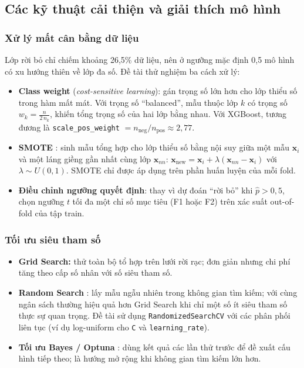 \subsection{Các kỹ thuật cải thiện và giải thích mô hình}

\subsubsection{Xử lý mất cân bằng dữ liệu}
Lớp rời bỏ chỉ chiếm khoảng 26,5\% dữ liệu, nên ở ngưỡng mặc định 0,5 mô hình có xu hướng thiên về lớp đa số. Đề tài thử nghiệm ba cách xử lý:
\begin{itemize}
    \item \textbf{Class weight} (\textit{cost-sensitive learning}): gán trọng số lớn hơn cho lớp thiểu số trong hàm mất mát. Với trọng số ``balanced'', mẫu thuộc lớp $k$ có trọng số $w_k = \frac{n}{2\, n_k}$, khiến tổng trọng số của hai lớp bằng nhau. Với XGBoost, tương đương là \texttt{scale\_pos\_weight} $= n_{\text{neg}} / n_{\text{pos}} \approx 2{,}77$.
    \item \textbf{SMOTE} \cite{chawla2002}: sinh mẫu tổng hợp cho lớp thiểu số bằng nội suy giữa một mẫu $\mathbf{x}_i$ và một láng giềng gần nhất cùng lớp $\mathbf{x}_{nn}$: $\mathbf{x}_{\text{new}} = \mathbf{x}_i + \lambda(\mathbf{x}_{nn} - \mathbf{x}_i)$ với $\lambda \sim U(0, 1)$. SMOTE chỉ được áp dụng trên phần huấn luyện của mỗi fold.
    \item \textbf{Điều chỉnh ngưỡng quyết định}: thay vì dự đoán ``rời bỏ'' khi $\hat{p} > 0{,}5$, chọn ngưỡng $t$ tối đa một chỉ số mục tiêu (F1 hoặc F2) trên xác suất out-of-fold của tập train.
\end{itemize}

\subsubsection{Tối ưu siêu tham số}
\begin{itemize}
    \item \textbf{Grid Search:} thử toàn bộ tổ hợp trên lưới rời rạc; đơn giản nhưng chi phí tăng theo cấp số nhân với số siêu tham số.
    \item \textbf{Random Search} \cite{bergstra2012}: lấy mẫu ngẫu nhiên trong không gian tìm kiếm; với cùng ngân sách thường hiệu quả hơn Grid Search khi chỉ một số ít siêu tham số thực sự quan trọng. Đề tài sử dụng \texttt{RandomizedSearchCV} với các phân phối liên tục (ví dụ log-uniform cho \texttt{C} và \texttt{learning\_rate}).
    \item \textbf{Tối ưu Bayes / Optuna} \cite{akiba2019}: dùng kết quả các lần thử trước để đề xuất cấu hình tiếp theo; là hướng mở rộng khi không gian tìm kiếm lớn hơn.
\end{itemize}

